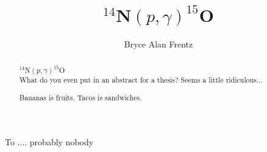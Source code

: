 \documentclass[numrefs,sort&compress]{nddiss2e}
\begin{document}
\frontmatter %

\title{$^{14}$N$\left( p,\gamma \right) ^{15}$O}
\author{Bryce Alan Frentz}

\maketitle
%
%

\makecopyright

\begin{abstract}
  
  $^{14}$N$\left( p,\gamma \right) ^{15}$O \\
  
  What do you even put in an abstract for a thesis? Seems a little ridiculous...
  
  Bananas is fruits.
  Tacos is sandwiches.
  
\end{abstract}

\renewcommand{\dedicationname}{NEW DEDICATION NAME}

\begin{dedication}
  To .... probably nobody
\end{dedication}

\tableofcontents
\listoffigures
\listoftables
\end{document}
